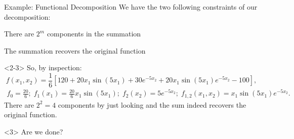 \documentclass[english,aspectratio=169]{beamer}
\let\tempone\itemize
\let\temptwo\enditemize
\renewenvironment{itemize}{\tempone\addtolength{\itemsep}{0.35\baselineskip}}{\temptwo}
\renewcommand{\emph}[1]{\textcolor[HTML]{006d2c}{\fontseries{sb}\selectfont #1}}
\begin{document}
\begin{frame}[fragile]{Example: Functional Decomposition}
\small
We have the two following constraints of our decomposition:
\vspace{1.0em}
\begin{itemize}
\item There are $2^m$ components in the summation
\item The summation recovers the original function
\end{itemize}

\vspace{1.5em}

\begin{onlyenv}<2-3>
  So, by \emph{inspection}:
  \begin{equation*}
    f(x_1, x_2) = \frac{1}{6} \left[ 120 + 20 x_1 \sin{(5x_1) + 30 e^{-5 x_2} + 20 x_1 \sin{(5 x_1)} e^{-5 x_2} - 100 } \right],
  \end{equation*}
  \begin{eqnarray*}
    f_0 = \frac{20}{6}; \; f_1(x_1) = \frac{20}{6} x_1 \sin{(5 x_1)}; \;  f_2(x_2) = 5 e^{-5 x_2}; \; f_{1, 2}(x_1, x_2) = x_1 \sin{(5 x_1)} e^{-5 x_2}.
  \end{eqnarray*}
  There are $2^2 = 4$ components by just looking and the sum indeed recovers the original function.
\end{onlyenv}

\vspace{-0.6em}

\begin{exampleblock}<3>{}
  \centering
  Are we done?
\end{exampleblock}

\end{frame}
\end{document}
